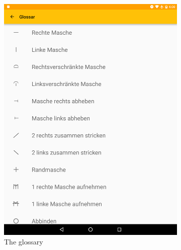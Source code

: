 \begin{figure}[H]
	\centering
	\begin{subfigure}[b]{0.5\textwidth}
	  \centering
	    \includegraphics[width=0.95\linewidth]{images/glossary_h900.png}
	    \caption[The glossary \protect{}]{The glossary}
	  \label{fig:glossary}
	\end{subfigure}
	\begin{subfigure}[b]{0.5\textwidth}
	  \centering

\end{subfigure}
\end{figure}
